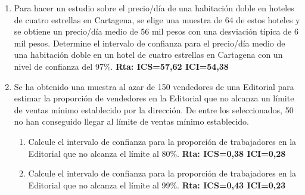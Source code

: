 \documentclass[letterpaper]{article}
\begin{document}
\begin{enumerate}
\begin{enumerate}
	\end{enumerate}
	\item Para hacer un estudio sobre el precio/día de una habitación doble en hoteles de cuatro estrellas en Cartagena, se elige una muestra de 64 de estos hoteles y se obtiene un precio/día medio de 56 mil pesos con una desviación típica de 6 mil pesos. Determine el intervalo de confianza para el precio/día medio de una habitación doble en un
	hotel de cuatro estrellas en Cartagena con un nivel de confianza del 97\%. {\bf Rta: ICS=57,62 ICI=54,38}
	\item Se ha obtenido una muestra al azar de 150 vendedores de una Editorial para estimar la proporción de vendedores en la Editorial que no alcanza un límite de ventas mínimo establecido por la dirección.
	De entre los seleccionados, 50 no han conseguido llegar al límite de ventas mínimo establecido.
	\begin{enumerate}
		\item Calcule el intervalo de confianza para la proporción de trabajadores en la Editorial que no alcanza el límite al 80\%. {\bf Rta: ICS=0,38 ICI=0,28}
		\item Calcule el intervalo de confianza para la proporción de trabajadores en la Editorial que no alcanza el límite al 99\%. {\bf Rta: ICS=0,43 ICI=0,23}
	\end{enumerate}
\end{enumerate}
\end{document}
